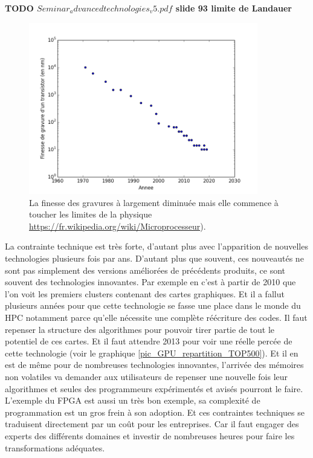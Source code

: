\textbf{TODO $Seminar_advanced technologies_v5.pdf$ slide 93 limite de Landauer}

\begin{figure}
    \center
    \includegraphics[width=10cm]{images/Chapitre1/Moore_gravure.png}
    \caption{\label{pic_Moore_gravure} La finesse des gravures à largement diminuée mais elle commence à toucher les limites de la physique \url{https://fr.wikipedia.org/wiki/Microprocesseur}).}
\end{figure}

La contrainte technique est très forte, d'autant plus avec l'apparition de nouvelles technologies plusieurs fois par ans. D'autant plus que souvent, ces nouveautés ne sont pas simplement des versions améliorées de précédents produits, ce sont souvent des technologies innovantes. Par exemple en c'est à partir de 2010 que l'on voit les premiers clusters contenant des cartes graphiques. Et il a fallut plusieurs années pour que cette technologie se fasse une place dans le monde du HPC notamment parce qu'elle nécessite une complète réécriture des codes. Il faut repenser la structure des algorithmes pour pouvoir tirer partie de tout le potentiel de ces cartes. Et il faut attendre 2013 pour voir une réelle percée de cette technologie (voir le graphique \ref{pic_GPU_repartition_TOP500}). Et il en est de même pour de nombreuses technologies innovantes, l'arrivée des mémoires non volatiles va demander aux utilisateurs de repenser une nouvelle fois leur algorithmes et seules des programmeurs expérimentés et avisés pourront le faire. L'exemple du FPGA est aussi un très bon exemple, sa complexité de programmation est un gros frein à son adoption. Et ces contraintes techniques se traduisent directement par un coût pour les entreprises. Car il faut engager des experts des différents domaines et investir de nombreuses heures pour faire les transformations adéquates.     



